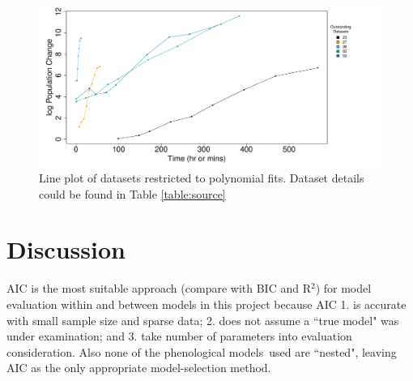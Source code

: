 \documentclass[a4paper, 11pt]{article}
\newcommand{\pms}{phenological models}
\begin{document}
 \begin{figure}[H]
 	\centering
 	\includegraphics[width=\linewidth]{../results/Log_outstanding.pdf}
 	\caption{Line plot of datasets restricted to polynomial fits. Dataset details could be found in Table \ref{table:source}}\label{lineOut}
 \end{figure}
	
	\section*{Discussion}
	
	AIC is the most suitable approach (compare with BIC and R$^2$) for model evaluation within and between models in this project because AIC 1. is accurate with small sample size\autocite{acquah2010comparison,kuha2004aic} and sparse data\autocite{kuha2004aic}; 2. does not assume a ``true model" was under examination\autocite{aho2014model,vrieze2012model,yang2005can}; and 3. take number of parameters into evaluation consideration\autocite{johnson2004model}.  Also none of the \pms\ used are ``nested"\autocite{wang2006comparison}, leaving AIC as the only appropriate model-selection method.
	
\end{document}
